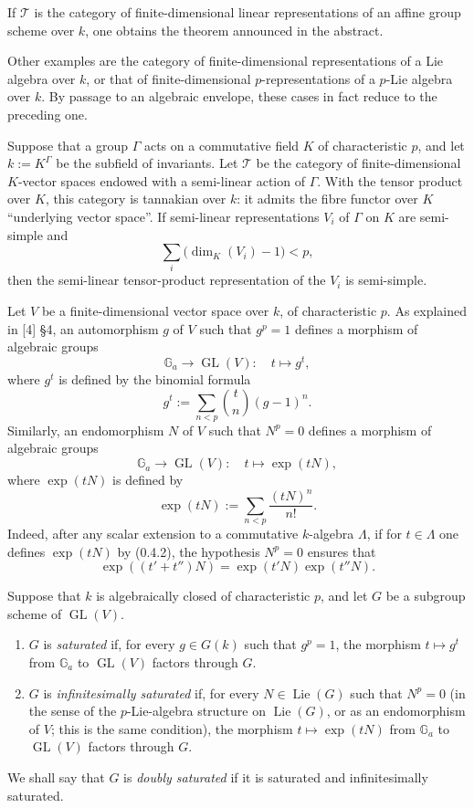 \documentclass[10pt]{article}
\newcommand{\Ga}{\mathbb G_a}
\newcommand{\GL}{\operatorname{GL}}
\newcommand{\Lie}{\operatorname{Lie}}
\newcommand{\T}{\mathcal T}
\theoremstyle{deligne}
\newcommand{\heading}[1]{\vspace{0.7em}\noindent{\bfseries #1}\quad}
\begin{document}
\heading{Example 0.2.} If \(\T\) is the category of finite-dimensional linear representations of an affine group scheme over \(k\), one obtains the theorem announced in the abstract.

Other examples are the category of finite-dimensional representations of a Lie algebra over \(k\), or that of finite-dimensional \(p\)-representations of a \(p\)-Lie algebra over \(k\). By passage to an algebraic envelope, these cases in fact reduce to the preceding one.

\heading{Example 0.3.} Suppose that a group \(\Gamma\) acts on a commutative field \(K\) of characteristic \(p\), and let \(k:=K^\Gamma\) be the subfield of invariants. Let \(\T\) be the category of finite-dimensional \(K\)-vector spaces endowed with a semi-linear action of \(\Gamma\). With the tensor product over \(K\), this category is tannakian over \(k\): it admits the fibre functor over \(K\) ``underlying vector space''. If semi-linear representations \(V_i\) of \(\Gamma\) on \(K\) are semi-simple and
\[
  \sum_i\bigl(\dim_K(V_i)-1\bigr)<p,
\]
then the semi-linear tensor-product representation of the \(V_i\) is semi-simple.

\heading{0.4.} Let \(V\) be a finite-dimensional vector space over \(k\), of characteristic \(p\). As explained in [4] §4, an automorphism \(g\) of \(V\) such that \(g^p=1\) defines a morphism of algebraic groups
\[
  \Ga \longrightarrow \GL(V):\quad t\longmapsto g^t,
\]
where \(g^t\) is defined by the binomial formula
\[
  g^t:=\sum_{n<p}\binom{t}{n}(g-1)^n. \tag{0.4.1}
\]
Similarly, an endomorphism \(N\) of \(V\) such that \(N^p=0\) defines a morphism of algebraic groups
\[
  \Ga \longrightarrow \GL(V):\quad t\longmapsto \exp(tN),
\]
where \(\exp(tN)\) is defined by
\[
  \exp(tN):=\sum_{n<p}\frac{(tN)^n}{n!}. \tag{0.4.2}
\]
Indeed, after any scalar extension to a commutative \(k\)-algebra \(\Lambda\), if for \(t\in\Lambda\) one defines \(\exp(tN)\) by (0.4.2), the hypothesis \(N^p=0\) ensures that
\[
  \exp((t'+t'')N)=\exp(t'N)\exp(t''N).
\]

\heading{Definition 0.5.} Suppose that \(k\) is algebraically closed of characteristic \(p\), and let \(G\) be a subgroup scheme of \(\GL(V)\).

\begin{enumerate}[label=(\roman*)]
\item \(G\) is \emph{saturated} if, for every \(g\in G(k)\) such that \(g^p=1\), the morphism \(t\mapsto g^t\) from \(\Ga\) to \(\GL(V)\) factors through \(G\).
\item \(G\) is \emph{infinitesimally saturated} if, for every \(N\in\Lie(G)\) such that \(N^p=0\) (in the sense of the \(p\)-Lie-algebra structure on \(\Lie(G)\), or as an endomorphism of \(V\); this is the same condition), the morphism \(t\mapsto\exp(tN)\) from \(\Ga\) to \(\GL(V)\) factors through \(G\).
\end{enumerate}
We shall say that \(G\) is \emph{doubly saturated} if it is saturated and infinitesimally saturated.
\end{document}
